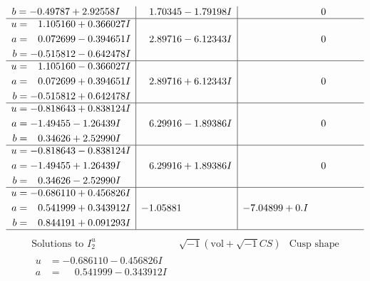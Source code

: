 \documentclass[1p]{elsarticle_modified}
\theoremstyle{definition}
\newcommand{\I}{\sqrt{-1}}
\begin{document}
$$\begin{array}{c|c|c}
\begin{aligned}
b &= -0.49787 + 2.92558 I\end{aligned}
 & \phantom{-}1.70345 - 1.79198 I & \phantom{-0.000000 } 0 \\ \hline\begin{aligned}
u &= \phantom{-}1.105160 + 0.366027 I \\
a &= \phantom{-}0.072699 - 0.394651 I \\
b &= -0.515812 - 0.642478 I\end{aligned}
 & \phantom{-}2.89716 - 6.12343 I & \phantom{-0.000000 } 0 \\ \hline\begin{aligned}
u &= \phantom{-}1.105160 - 0.366027 I \\
a &= \phantom{-}0.072699 + 0.394651 I \\
b &= -0.515812 + 0.642478 I\end{aligned}
 & \phantom{-}2.89716 + 6.12343 I & \phantom{-0.000000 } 0 \\ \hline\begin{aligned}
u &= -0.818643 + 0.838124 I \\
a &= -1.49455 - 1.26439 I \\
b &= \phantom{-}0.34626 + 2.52990 I\end{aligned}
 & \phantom{-}6.29916 - 1.89386 I & \phantom{-0.000000 } 0 \\ \hline\begin{aligned}
u &= -0.818643 - 0.838124 I \\
a &= -1.49455 + 1.26439 I \\
b &= \phantom{-}0.34626 - 2.52990 I\end{aligned}
 & \phantom{-}6.29916 + 1.89386 I & \phantom{-0.000000 } 0 \\ \hline\begin{aligned}
u &= -0.686110 + 0.456826 I \\
a &= \phantom{-}0.541999 + 0.343912 I \\
b &= \phantom{-}0.844191 + 0.091293 I\end{aligned}
 & -1.05881\phantom{ +0.000000I} & -7.04899 + 0. I\phantom{ +0.000000I}\\
 \hline 
 \end{array}$$\newpage$$\begin{array}{c|c|c}  
\text{Solutions to }I^u_{2}& \I (\text{vol} + \sqrt{-1}CS) & \text{Cusp shape}\\
 \hline 
\begin{aligned}
u &= -0.686110 - 0.456826 I \\
a &= \phantom{-}0.541999 - 0.343912 I \\

\end{aligned}
\end{array}$$
\end{document}
